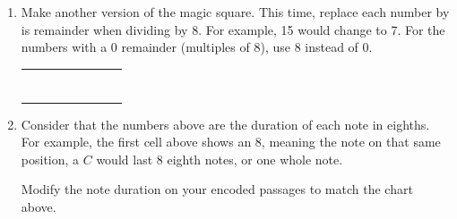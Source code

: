 \documentclass[12pt,noauthor,nooutcomes,hints,instructornotes]{ximera}%
\begin{document}
\begin{question}
\begin{enumerate}
\item Make another version of the magic square. This time, replace each number by is remainder when dividing by 8. For example, 15 would change to 7. For the numbers with a 0 remainder (multiples of 8), use 8 instead of 0.

\begin{center}
    \renewcommand{\arraystretch}{3}
\begin{tabular}{|c|c|c|c|c|c|c|c|}\hline
\hspace{30 pt} & \hspace{30 pt} & \hspace{30 pt} & \hspace{30 pt} & \hspace{30 pt} & \hspace{30 pt} & \hspace{30 pt} & \hspace{30 pt} \\\hline
&&&&&&&\\\hline
&&&&&&&\\\hline
&&&&&&&\\\hline
&&&&&&&\\\hline
&&&&&&&\\\hline
&&&&&&&\\\hline
&&&&&&&\\\hline
\end{tabular}
\end{center}

\item Consider that the numbers above are the duration of each note in eighths. For example, the first cell above shows an 8, meaning the note on that same position, a $C$ would last 8 eighth notes, or one whole note.

Modify the note duration on your encoded passages to match the chart above.

\end{enumerate}
\end{question}
\end{document}
